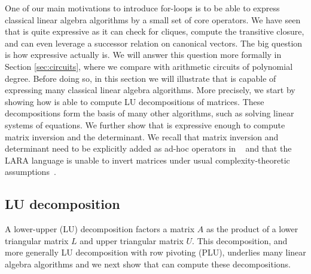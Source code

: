 
One of our main motivations to introduce for-loops is to be able to express classical linear algebra algorithms by a small set of core operators. We have seen that \langfor is
quite expressive as it can check for cliques, compute the transitive closure, and can even
leverage a successor relation on canonical vectors. The big question is how expressive \langfor
actually is. We will answer this question more formally in Section \ref{sec:circuits}, where we compare \langfor with 
arithmetic circuits of polynomial degree.
Before doing so, in this section we will illustrate that \langfor is capable of expressing many classical linear algebra algorithms. More precisely, we start by showing how  \langfor is able to
compute LU decompositions of matrices. These decompositions form the basis of many other algorithms, such as solving linear systems of equations. We further show that \langfor is expressive enough to compute matrix inversion and the determinant. We recall that matrix inversion and determinant need to be explicitly added as ad-hoc operators in \lang~\cite{matlang-journal} and that the LARA language is unable to invert matrices under usual complexity-theoretic assumptions~\cite{BarceloH0S20}.


\subsection{LU decomposition}

A lower-upper (LU) decomposition factors a matrix $A$ as the product of a lower triangular matrix $L$ and upper triangular matrix $U$.  
This decomposition, and more generally LU decomposition with row pivoting (PLU),  underlies many linear algebra algorithms and 
we next show that \langfor can compute these decompositions.

